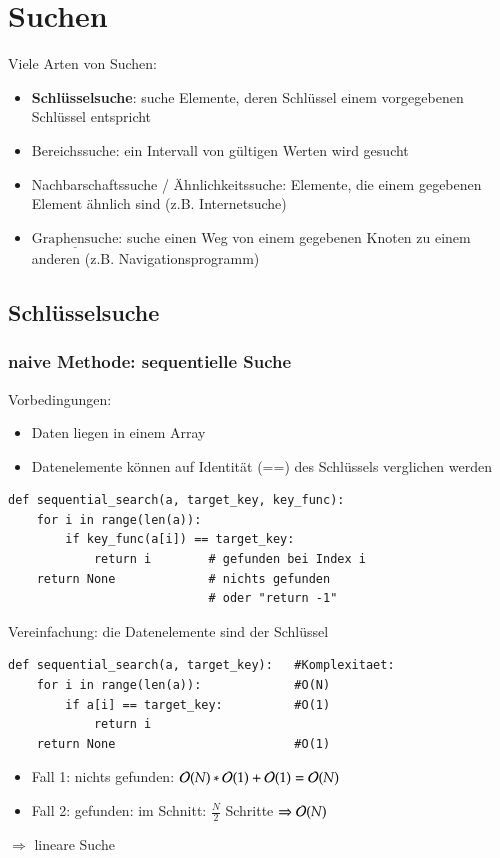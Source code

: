 
\chapter{Suchen}
Viele Arten von Suchen:
\begin{itemize}
    \item \textbf{Schlüsselsuche}: suche Elemente, deren Schlüssel einem vorgegebenen Schlüssel entspricht
    \item Bereichssuche: ein Intervall von gültigen Werten wird gesucht
    \item Nachbarschaftssuche / Ähnlichkeitssuche: Elemente, die einem gegebenen Element ähnlich sind (z.B. Internetsuche)
    \item $\underline{\text{Graphensuche}}$: suche einen Weg von einem gegebenen Knoten zu einem anderen (z.B. Navigationsprogramm)
\end{itemize}

\section{Schlüsselsuche}

\subsection*{naive Methode: sequentielle Suche}
Vorbedingungen:
\begin{itemize}
    \item Daten liegen in einem Array
    \item Datenelemente können auf Identität (==) des Schlüssels verglichen werden
\end{itemize}

\begin{verbatim}
def sequential_search(a, target_key, key_func):
    for i in range(len(a)):
        if key_func(a[i]) == target_key:
            return i        # gefunden bei Index i
    return None             # nichts gefunden
                            # oder "return -1"
    \end{verbatim}

    Vereinfachung: die Datenelemente sind der Schlüssel

    \begin{verbatim}
def sequential_search(a, target_key):   #Komplexitaet:
    for i in range(len(a)):             #O(N)
        if a[i] == target_key:          #O(1)
            return i
    return None                         #O(1)
        \end{verbatim}
        \begin{itemize}
            \item Fall 1: nichts gefunden: $\mathcal{O}{}(N) * \mathcal{O}{}(1) + \mathcal{O}{}(1) = \mathcal{O}{}(N)$
            \item Fall 2: gefunden: im Schnitt: $\frac{N}{2}$ Schritte $\Rightarrow \mathcal{O}{}(N)$
        \end{itemize}
        $\Rightarrow$ \glqq lineare Suche\grqq

